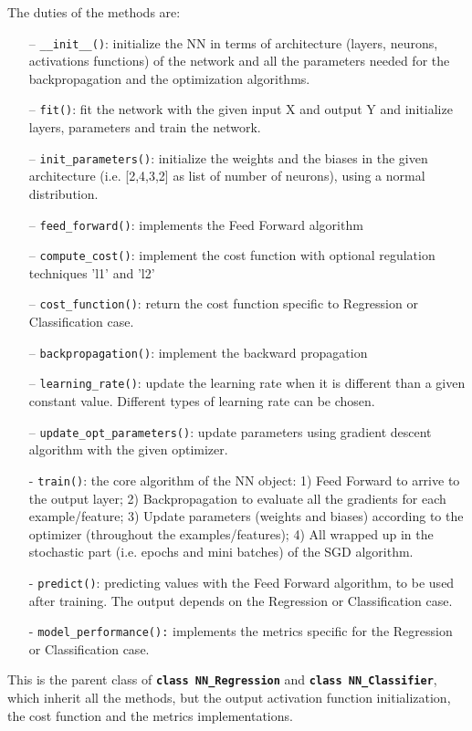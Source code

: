 \documentclass[english,notitlepage,reprint,nofootinbib]{revtex4-1}  %
\begin{document}
The duties of the methods are:
\begin{itemize}
    \item[–] \texttt{\_\_init\_\_()}: initialize the NN in terms of architecture (layers, neurons, activations functions) of the network and all the parameters needed for the backpropagation and the optimization algorithms.
    \item[–] \texttt{fit()}: fit the network with the given input X and output Y and initialize layers, parameters and train the network.
    \item[–] \texttt{init\_parameters()}: initialize the weights and the biases in the given architecture (i.e. [2,4,3,2] as list of number of neurons), using a normal distribution.
    \item[–] \texttt{feed\_forward()}: implements the Feed Forward algorithm
    \item[–] \texttt{compute\_cost()}: implement the cost function with optional regulation techniques 'l1' and 'l2'
    \item[–] \texttt{cost\_function()}: return the cost function specific to Regression or Classification case.
    \item[–] \texttt{backpropagation()}: implement the backward propagation
    \item[–] \texttt{learning\_rate()}: update the learning rate when it is different than a given constant value. Different types of learning rate can be chosen.
    \item[–] \texttt{update\_opt\_parameters()}: update parameters using gradient descent algorithm with the given optimizer.
    \item[-] \texttt{train()}: the core algorithm of the NN object: 1) Feed Forward to arrive to the output layer; 2) Backpropagation to evaluate all the gradients for each example/feature; 3) Update parameters (weights and biases) according to the optimizer (throughout the examples/features); 4) All wrapped up in the stochastic part (i.e. epochs and mini batches) of the SGD algorithm.
    \item[-] \texttt{predict()}: predicting values with the Feed Forward algorithm, to be used after training. The output depends on the Regression or Classification case.
    \item[-] \texttt{model\_performance():} implements the metrics specific for the Regression or Classification case.
\end{itemize}

This is the parent class of \texttt{\textbf{class NN\_Regression}} and \texttt{\textbf{class NN\_Classifier}}, which inherit all the methods, but the output activation function initialization, the cost function and the metrics implementations.
\end{document}
